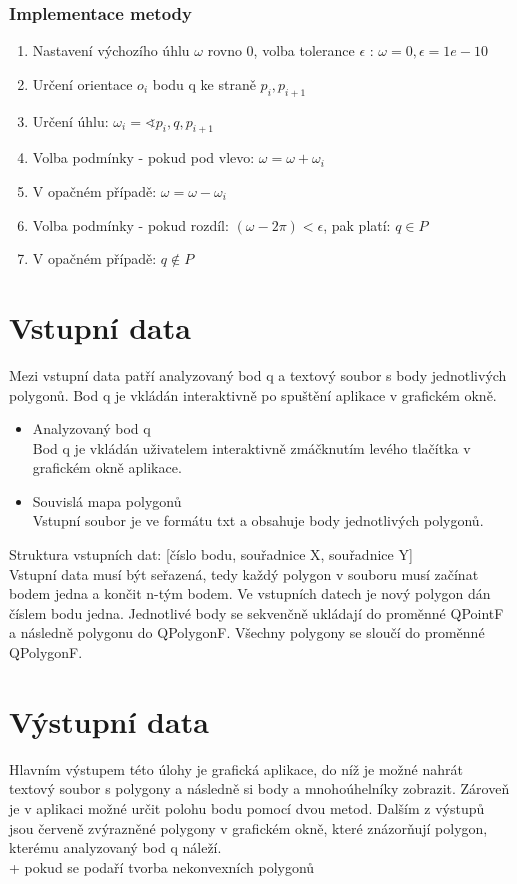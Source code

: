 \documentclass[a4paper, 12pt]{article}
\begin{document}
\subsubsection{Implementace metody}
\begin{enumerate}
\item Nastavení výchozího úhlu $\omega$ rovno 0, volba tolerance $\epsilon$ : $\omega = 0, \epsilon = 1e-10$
\item Určení orientace $o_i$ bodu q ke straně $p_i, p_{i+1}$
\item Určení úhlu: $\omega_i = \sphericalangle p_i, q, p_{i+1}$
\item Volba podmínky - pokud pod vlevo: $\omega = \omega + \omega_i$
\item V opačném případě: $\omega = \omega - \omega_i$
\item Volba podmínky - pokud rozdíl: $(\omega - 2\pi) < \epsilon$, pak platí: $q \in P$
\item V opačném případě:  $ q { \not \in } P $
\end{enumerate}

\section{Vstupní data}
Mezi vstupní data patří analyzovaný bod q a textový soubor s body jednotlivých polygonů. Bod q je vkládán interaktivně po spuštění aplikace v grafickém okně. 
\\
\begin{itemize}
\item Analyzovaný bod q\\
Bod q je vkládán uživatelem interaktivně zmáčknutím levého tlačítka v grafickém okně aplikace.

\item Souvislá mapa polygonů\\
Vstupní soubor je ve formátu txt a obsahuje body jednotlivých polygonů.
\end{itemize}


Struktura vstupních dat:
[číslo bodu, souřadnice X, souřadnice Y]\\

Vstupní data musí být seřazená, tedy každý polygon v souboru musí začínat bodem jedna a končit n-tým bodem.  Ve vstupních datech je nový polygon dán číslem bodu jedna. Jednotlivé body se sekvenčně ukládají do proměnné QPointF a následně polygonu do QPolygonF. Všechny polygony se sloučí do proměnné  QPolygonF.

\section{Výstupní data}
Hlavním výstupem této úlohy je grafická aplikace, do níž je možné nahrát textový soubor s polygony a následně si body a mnohoúhelníky zobrazit. Zároveň je v aplikaci možné určit polohu bodu pomocí dvou metod. Dalším z výstupů jsou červeně zvýrazněné polygony v grafickém okně, které znázorňují polygon, kterému analyzovaný bod q náleží.
\\
+ pokud se podaří tvorba nekonvexních polygonů
\end{document}
